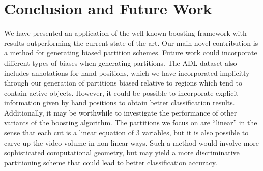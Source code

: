 \documentclass[10pt,twocolumn,letterpaper]{article}
\begin{document}
\section{Conclusion and Future Work}
	We have presented an application of the well-known boosting framework
	with results outperforming the current state of the art. 
	Our main novel contribution is a method for generating biased partition
	schemes.
	Future work could incorporate different types of biases when generating
	partitions. The ADL dataset also includes annotations for hand positions,
	which we have incorporated implicitly through our generation of partitions
	biased relative to regions which tend to contain active objects. However,
	it could be possible to incorporate explicit information given by hand
	positions to obtain better classification results.
	Additionally, it may be worthwhile to investigate the performance of other
	variants of the boosting algorithm.
	The partitions we focus on are ``linear'' in the sense that each cut is a
	linear equation of 3 variables, but it is also possible to carve up the
	video volume in non-linear ways. Such a method would involve more
	sophisticated computational geometry, but may yield a more discriminative
	partitioning scheme that could lead to better classification accuracy.

{\small


}
\end{document}

